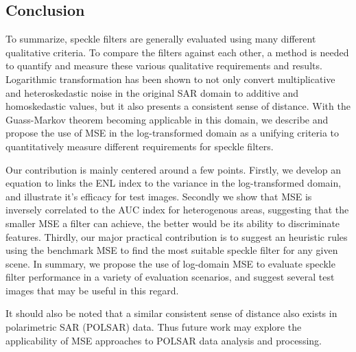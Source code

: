 \documentclass[journal]{IEEEtran}
\begin{document}
\subsection{Conclusion}

To summarize, speckle filters are generally evaluated using many different qualitative criteria.
To compare the filters against each other, a method is needed to quantify and measure these various qualitative 
requirements and results.
Logarithmic transformation has been shown to not only convert multiplicative and heteroskedastic noise in the 
original SAR domain to additive and homoskedastic values, but it also presents a consistent sense of distance.
With the Guass-Markov theorem becoming applicable in this domain, we describe and propose the use of MSE in the 
log-transformed domain as a unifying criteria to quantitatively measure different requirements for speckle filters.

Our contribution is mainly centered around a few points. 
Firstly, we develop an equation to links the ENL index to the variance in the log-transformed domain, 
and illustrate it's efficacy for test images.
Secondly we show that MSE is inversely correlated to the AUC index for heterogenous areas, suggesting that 
the smaller MSE a filter can achieve, the better would be its ability to discriminate features.
Thirdly, our major practical contribution is to suggest an heuristic rules using the benchmark MSE to find 
the most suitable speckle filter for any given scene. 
In summary, we propose the use of log-domain MSE to evaluate speckle filter performance in a variety of evaluation 
scenarios, and suggest several test images that may be useful in this regard.

It should also be noted that a similar consistent sense of distance also exists in polarimetric SAR (POLSAR) data. 
Thus future work may explore the applicability of MSE approaches to POLSAR data analysis and processing.



\end{document}
